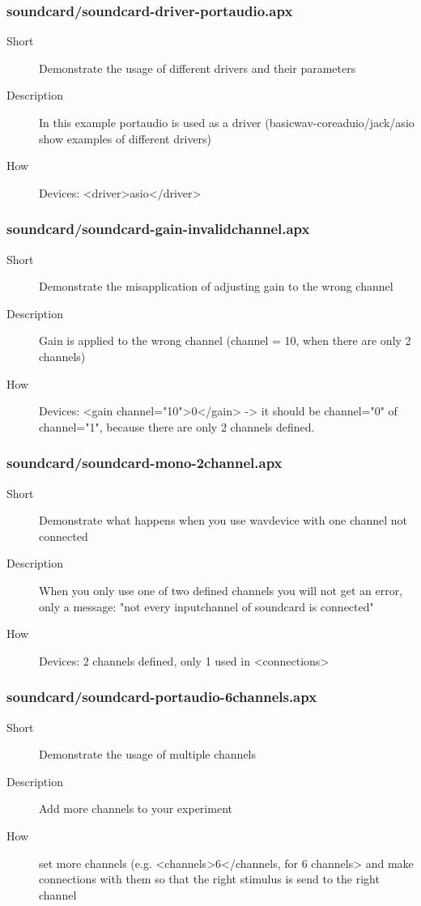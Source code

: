 \subsubsection{soundcard/soundcard-driver-portaudio.apx}
\begin{description}
\item[Short] 
 Demonstrate the usage of different drivers and their parameters
\item[Description] 
 In this example portaudio is used as a driver (basicwav-coreaduio/jack/asio show examples of different drivers)
\item[How] 
 Devices: \textless{}driver\textgreater{}asio\textless{}/driver\textgreater{}
\end{description}

\subsubsection{soundcard/soundcard-gain-invalidchannel.apx}
\begin{description}
\item[Short] 
 Demonstrate the misapplication of adjusting gain to the wrong channel
\item[Description] 
 Gain is applied to the wrong channel (channel = 10, when there are only 2 channels)
\item[How] 
 Devices:  \textless{}gain channel="10"\textgreater{}0\textless{}/gain\textgreater{} -\textgreater{} it should be channel="0" of channel="1", because there are only 2 channels defined.
\end{description}

\subsubsection{soundcard/soundcard-mono-2channel.apx}
\begin{description}
\item[Short] 
 Demonstrate what happens when you use wavdevice with one channel not connected
\item[Description] 
 When you only use one of two defined channels you will not get an error, only a message: "not every inputchannel of soundcard is connected"
\item[How] 
 Devices: 2 channels defined, only 1 used in \textless{}connections\textgreater{}
\end{description}

\subsubsection{soundcard/soundcard-portaudio-6channels.apx}
\begin{description}
\item[Short] 
 Demonstrate the usage of multiple channels
\item[Description] 
 Add more channels to your experiment
\item[How] 
 set more channels (e.g. \textless{}channels\textgreater{}6\textless{}/channels, for 6 channels\textgreater{} and make connections with them so that the right stimulus is send to the right channel
\end{description}

